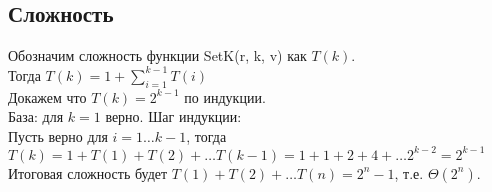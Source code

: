 \documentclass[12pt]{exam}
\begin{document}
\subsection*{Сложность}
Обозначим сложность функции SetK(r, k, v) как $T(k)$. \\
Тогда $T(k) = 1 + \sum_{i = 1}^{k - 1} T(i)$ \\
Докажем что $T(k) = 2^{k - 1}$ по индукции. \\
База: для $k = 1$ верно.
Шаг индукции: \\
Пусть верно для $i = 1 \ldots k - 1$, тогда \\
$T(k) = 1 + T(1) + T(2) + \ldots T(k - 1) = 1 + 1 + 2 + 4 + \ldots 2^{k-2} = 2^{k-1}$\\
Итоговая сложность будет $T(1) + T(2) + \ldots T(n) = 2^n - 1$, т.е. $\Theta(2^n)$.
\end{document}
